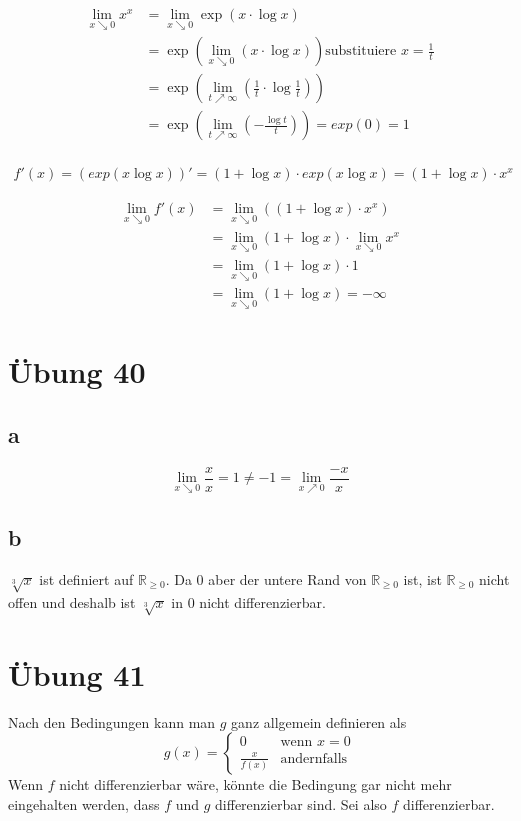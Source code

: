 \documentclass[a4paper,10pt]{article}
\begin{document}
\begin{align*}
 \lim_{x \searrow 0} x^x & = \lim_{x \searrow 0} \exp(x \cdot \log x)\\
 & = \exp\left(\lim_{x \searrow 0} (x \cdot \log x)\right) \text{substituiere $x = \frac{1}{t}$}\\
 & = \exp\left(\lim_{t \nearrow \infty} (\frac{1}{t} \cdot \log \frac{1}{t})\right)\\
 & = \exp\left(\lim_{t \nearrow \infty} (-\frac{\log t}{t})\right) = exp(0) = 1\\
\end{align*}

\begin{align*}
 f'(x) = \left(exp(x \log x)\right)' = (1 + \log x) \cdot exp(x \log x) = (1 + \log x) \cdot x^x
\end{align*}

\begin{align*}
 \lim_{x \searrow 0} f'(x) & = \lim_{x \searrow 0} \left( (1 + \log x) \cdot x^x \right)\\
 & = \lim_{x \searrow 0} (1 + \log x) \cdot \lim_{x \searrow 0} x^x\\
 & = \lim_{x \searrow 0} (1 + \log x) \cdot 1\\
 & = \lim_{x \searrow 0} (1 + \log x) = -\infty
\end{align*}

\section*{Übung 40}

\subsection*{a}

\begin{equation}
 \lim_{x \searrow 0} \frac{x}{x} = 1 \ne -1 = \lim_{x \nearrow 0} \frac{-x}{x}
\end{equation}

\subsection*{b}

$\sqrt[3]{x}$ ist definiert auf $\mathbb{R}_{\ge 0}$.
Da $0$ aber der untere Rand von $\mathbb{R}_{\ge 0}$ ist, ist $\mathbb{R}_{\ge 0}$ nicht offen und deshalb ist $\sqrt[3]{x}$ in $0$ nicht differenzierbar.

\section*{Übung 41}

Nach den Bedingungen kann man $g$ ganz allgemein definieren als
\begin{equation}
 g(x) = 
  \begin{cases}
   0 & \text{wenn $x = 0$}\\
   \frac{x}{f(x)} & \text{andernfalls}
  \end{cases}
\end{equation}
Wenn $f$ nicht differenzierbar wäre, könnte die Bedingung gar nicht mehr eingehalten werden, dass $f$ und $g$ differenzierbar sind.
Sei also $f$ differenzierbar.
\end{document}
